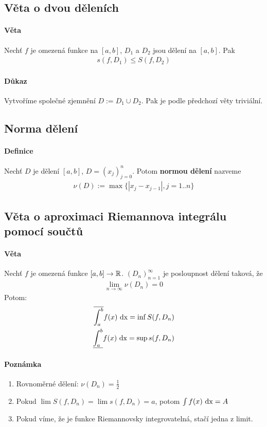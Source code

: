 \documentclass[a4paper,10pt]{article}
\newcommand{\Nu}{\nu}
\begin{document}
\subsection{Věta o dvou děleních}
\setcounter{equation}{0}
\paragraph{Věta}
Nechť $f$ je omezená funkce na $[a,b]$, $D_1$ a $D_2$ jsou dělení na $[a,b]$. Pak
\begin{align*}
	s(f, D_1) \le S(f, D_2)
\end{align*}

\paragraph{Důkaz}
Vytvoříme společné zjemnění $D := D_1 \cup D_2$. Pak je podle předchozí věty
triviální.

\subsection{Norma dělení}
\setcounter{equation}{0}
\paragraph{Definice}
Nechť $D$ je dělení $[a,b]$, $D = (x_j)_{j=0}^n$. Potom \textbf{normou dělení}
nazveme
\begin{align*}
	\Nu(D) := \max \{ |x_j - x_{j-1} |, j = 1..n \}
\end{align*}


\subsection{Věta o aproximaci Riemannova integrálu pomocí součtů}
\setcounter{equation}{0}
\paragraph{Věta}
Nechť $f$ je omezená funkce $[a,b] \to \mathbb{R}$. $(D_n)_{n=1}^\infty$ je posloupnost
dělení taková, že 
\begin{align*}
	\lim_{n\to\infty} \Nu(D_n) = 0
\end{align*}
Potom:
\begin{align*}
	\overline{\int_a^b} f(x) \operatorname*{\,dx} = \inf S(f, D_n) \\
	\underline{\int_a^b} f(x) \operatorname*{\,dx} = \sup s(f, D_n)
\end{align*}

\paragraph{Poznámka}
\begin{enumerate}
	\item  Rovnoměrné dělení: $\Nu(D_n) = \frac{1}{2}$
	\item  Pokud $\lim S(f, D_n) = \lim s(f, D_n) = a$, potom $\int f(x) \operatorname*{\,dx} = A$
	\item  Pokud víme, že je funkce Riemannovsky integrovatelná, stačí jedna z
	limit.
\end{enumerate}
\end{document}
